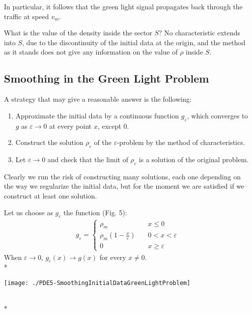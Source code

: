 \documentclass[../main.tex]{subfiles}
\begin{document}
In particular, it follows that the green light signal propagates back through the traffic at speed $v_m$.

What is the value of the density inside the sector $S$? No characteristic extends into $S$, due to the discontinuity of the initial data at the origin, and the method as it stands does not give any information on the value of $\rho$ inside $S$.

\subsection{Smoothing in the Green Light Problem}

A strategy that may give a reasonable answer is the following:

\begin{enumerate}
  \item Approximate the initial data by a continuous function $g_{\varepsilon}$, which converges to $g$ as $\varepsilon \to 0$ at every point $x$, except 0.
  \item Construct the solution $\rho_{\varepsilon}$ of the $\varepsilon$-problem by the method of characteristics.
  \item Let $\varepsilon \to 0$ and check that the limit of $\rho_{\varepsilon}$ is a solution of the original problem.
\end{enumerate}

Clearly we run the risk of constructing many solutions, each one depending on the way we regularize the initial data, but for the moment we are satisfied if we construct at least one solution.

Let us choose as $g_{\varepsilon}$ the function (Fig. 5):
\begin{align} \label{eq:27}
    g_{\varepsilon} = \begin{cases}
                          \rho_m \quad & x \leqslant 0 \\
                          \rho_m \left(1 - \frac{x}{\varepsilon}\right) \quad & 0 < x < \varepsilon \\
                          0 \quad & x \geqslant \varepsilon
                      \end{cases}
\end{align}
When $\varepsilon \to 0$, $g_\varepsilon(x) \to g(x)$ for every $x \ne 0$.
\\*

\begin{wrapfigure}{\linewidth} \label{fig:5}
\centering
\texttt{[image: ./PDE5-SmoothingInitialDataGreenLightProblem]}
    \begin{center}
    \end{center}
\end{wrapfigure}
\\*
\end{document}
